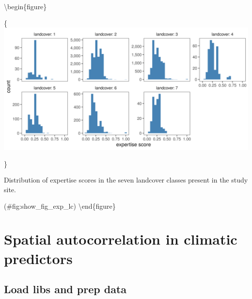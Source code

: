 \documentclass[]{article}
\begin{document}
\textbackslash{}begin\{figure\}

\{\centering \includegraphics[width=\textwidth]{figs/fig_exp_lc}

\}

\caption{Distribution of expertise scores in the seven landcover classes present in the study site.}

(\#fig:show\_fig\_exp\_lc)
\textbackslash{}end\{figure\}

\hypertarget{spatial-autocorrelation-in-climatic-predictors}{%
\section{Spatial autocorrelation in climatic predictors}\label{spatial-autocorrelation-in-climatic-predictors}}

\hypertarget{load-libs-and-prep-data}{%
\subsection{Load libs and prep data}\label{load-libs-and-prep-data}}
\end{document}
